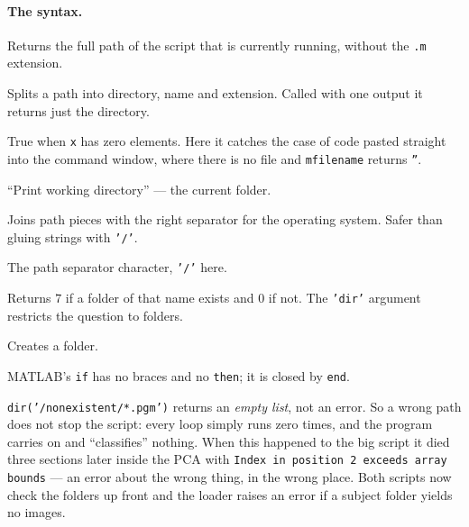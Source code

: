 \paragraph{The syntax.}
\begin{description}[leftmargin=*,style=nextline,nosep]
\item[\texttt{mfilename('fullpath')}] Returns the full path of the script that
  is currently running, without the \texttt{.m} extension.
\item[\texttt{fileparts(p)}] Splits a path into directory, name and extension.
  Called with one output it returns just the directory.
\item[\texttt{isempty(x)}] True when \texttt{x} has zero elements. Here it
  catches the case of code pasted straight into the command window, where there
  is no file and \texttt{mfilename} returns \texttt{''}.
\item[\texttt{pwd}] ``Print working directory'' --- the current folder.
\item[\texttt{fullfile(a,b,c)}] Joins path pieces with the right separator for
  the operating system. Safer than gluing strings with \texttt{'/'}.
\item[\texttt{filesep}] The path separator character, \texttt{'/'} here.
\item[\texttt{exist(name,'dir')}] Returns $7$ if a folder of that name exists
  and $0$ if not. The \texttt{'dir'} argument restricts the question to folders.
\item[\texttt{mkdir}] Creates a folder.
\item[\texttt{if \ldots end}] MATLAB's \texttt{if} has no braces and no
  \texttt{then}; it is closed by \texttt{end}.
\end{description}

\begin{gotcha}
\texttt{dir('/nonexistent/*.pgm')} returns an \emph{empty list}, not an error.
So a wrong path does not stop the script: every loop simply runs zero times,
and the program carries on and ``classifies'' nothing. When this happened to
the big script it died three sections later inside the PCA with
\texttt{Index in position 2 exceeds array bounds} --- an error about the
wrong thing, in the wrong place. Both scripts now check the folders up front
and the loader raises an error if a subject folder yields no images.
\end{gotcha}

